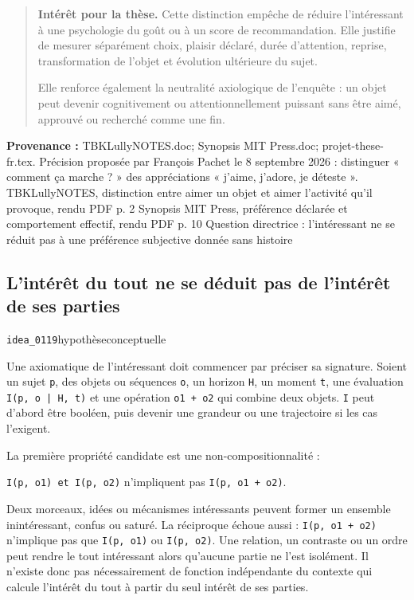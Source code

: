 \documentclass[10pt,a4paper]{article}
\begin{document}
\begin{quote}
\textbf{Intérêt pour la thèse.} Cette distinction empêche de réduire l'intéressant à une psychologie du goût ou à un score de recommandation. Elle justifie de mesurer séparément choix, plaisir déclaré, durée d'attention, reprise, transformation de l'objet et évolution ultérieure du sujet.

Elle renforce également la neutralité axiologique de l'enquête : un objet peut devenir cognitivement ou attentionnellement puissant sans être aimé, approuvé ou recherché comme une fin.
\end{quote}
{\footnotesize\color{metadata}\textbf{Provenance :} TBKLullyNOTES.doc; Synopsis MIT Press.doc; projet-these-fr.tex. Précision proposée par François Pachet le 8 septembre 2026 : distinguer « comment ça marche ? » des appréciations « j'aime, j'adore, je déteste ». TBKLullyNOTES, distinction entre aimer un objet et aimer l'activité qu'il provoque, rendu PDF p. 2 Synopsis MIT Press, préférence déclarée et comportement effectif, rendu PDF p. 10 Question directrice : l'intéressant ne se réduit pas à une préférence subjective donnée sans histoire\par}

\subsection{L'intérêt du tout ne se déduit pas de l'intérêt de ses parties}
{\small\color{metadata} \texttt{idea\_0119}\quad\textbullet\quad hypothèse\quad\textbullet\quad conceptuelle\par}

Une axiomatique de l'intéressant doit commencer par préciser sa signature. Soient un sujet \texttt{p}, des objets ou séquences \texttt{o}, un horizon \texttt{H}, un moment \texttt{t}, une évaluation \texttt{I(p, o | H, t)} et une opération \texttt{o1 + o2} qui combine deux objets. \texttt{I} peut d'abord être booléen, puis devenir une grandeur ou une trajectoire si les cas l'exigent.

La première propriété candidate est une non-compositionnalité :

\texttt{I(p, o1) et I(p, o2)} n'impliquent pas \texttt{I(p, o1 + o2)}.

Deux morceaux, idées ou mécanismes intéressants peuvent former un ensemble inintéressant, confus ou saturé. La réciproque échoue aussi : \texttt{I(p, o1 + o2)} n'implique pas que \texttt{I(p, o1)} ou \texttt{I(p, o2)}. Une relation, un contraste ou un ordre peut rendre le tout intéressant alors qu'aucune partie ne l'est isolément. Il n'existe donc pas nécessairement de fonction indépendante du contexte qui calcule l'intérêt du tout à partir du seul intérêt de ses parties.
\end{document}
